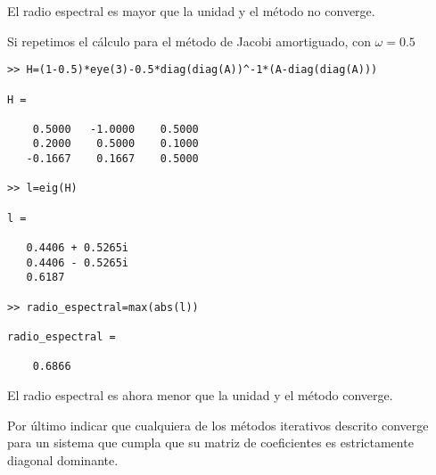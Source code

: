 El radio espectral es mayor que la unidad y el método no converge.

Si repetimos el cálculo para el método de Jacobi amortiguado, con $\omega=0.5$
\begin{verbatim}
>> H=(1-0.5)*eye(3)-0.5*diag(diag(A))^-1*(A-diag(diag(A)))

H =

    0.5000   -1.0000    0.5000
    0.2000    0.5000    0.1000
   -0.1667    0.1667    0.5000

>> l=eig(H)

l =

   0.4406 + 0.5265i
   0.4406 - 0.5265i
   0.6187          

>> radio_espectral=max(abs(l))

radio_espectral =

    0.6866
\end{verbatim}

El radio espectral es ahora menor que la unidad y el método converge.

Por último indicar que cualquiera de los métodos iterativos descrito converge para un sistema que cumpla que su matriz de coeficientes es estrictamente diagonal dominante.
